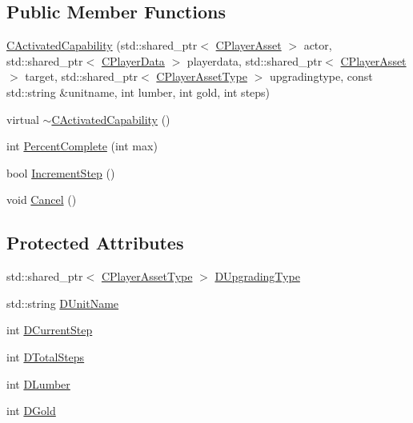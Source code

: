 \subsection*{Public Member Functions}
\begin{DoxyCompactItemize}
\item 
\hyperlink{classCPlayerCapabilityBuildRanger_1_1CActivatedCapability_a8b462671b0888c5374f4196b04d411d6}{C\+Activated\+Capability} (std\+::shared\+\_\+ptr$<$ \hyperlink{classCPlayerAsset}{C\+Player\+Asset} $>$ actor, std\+::shared\+\_\+ptr$<$ \hyperlink{classCPlayerData}{C\+Player\+Data} $>$ playerdata, std\+::shared\+\_\+ptr$<$ \hyperlink{classCPlayerAsset}{C\+Player\+Asset} $>$ target, std\+::shared\+\_\+ptr$<$ \hyperlink{classCPlayerAssetType}{C\+Player\+Asset\+Type} $>$ upgradingtype, const std\+::string \&unitname, int lumber, int gold, int steps)
\item 
virtual \hyperlink{classCPlayerCapabilityBuildRanger_1_1CActivatedCapability_afd5d1ba5ad2b35faa67e4574627d46e1}{$\sim$\+C\+Activated\+Capability} ()
\item 
int \hyperlink{classCPlayerCapabilityBuildRanger_1_1CActivatedCapability_a2e1c0859b129404fe1cc65bcdb187bad}{Percent\+Complete} (int max)
\item 
bool \hyperlink{classCPlayerCapabilityBuildRanger_1_1CActivatedCapability_a5fd10074c6b25ffb36401055ed90b70b}{Increment\+Step} ()
\item 
void \hyperlink{classCPlayerCapabilityBuildRanger_1_1CActivatedCapability_a46a5240502d6a8de65d3d56bbda8bf91}{Cancel} ()
\end{DoxyCompactItemize}
\subsection*{Protected Attributes}
\begin{DoxyCompactItemize}
\item 
std\+::shared\+\_\+ptr$<$ \hyperlink{classCPlayerAssetType}{C\+Player\+Asset\+Type} $>$ \hyperlink{classCPlayerCapabilityBuildRanger_1_1CActivatedCapability_a86cf7894dce398e7c5f4642e57e31682}{D\+Upgrading\+Type}
\item 
std\+::string \hyperlink{classCPlayerCapabilityBuildRanger_1_1CActivatedCapability_a0914856622c9b77b9943add2491c97be}{D\+Unit\+Name}
\item 
int \hyperlink{classCPlayerCapabilityBuildRanger_1_1CActivatedCapability_a27be6f32606ef0dcc31ec42e0504611c}{D\+Current\+Step}
\item 
int \hyperlink{classCPlayerCapabilityBuildRanger_1_1CActivatedCapability_a322dd429ae588ed82febdcf459232bee}{D\+Total\+Steps}
\item 
int \hyperlink{classCPlayerCapabilityBuildRanger_1_1CActivatedCapability_a149028982faf1d393580d5d57bf4da03}{D\+Lumber}
\item 
int \hyperlink{classCPlayerCapabilityBuildRanger_1_1CActivatedCapability_a1943b07bf35da2a475fd1bb36ca777ab}{D\+Gold}
\end{DoxyCompactItemize}


